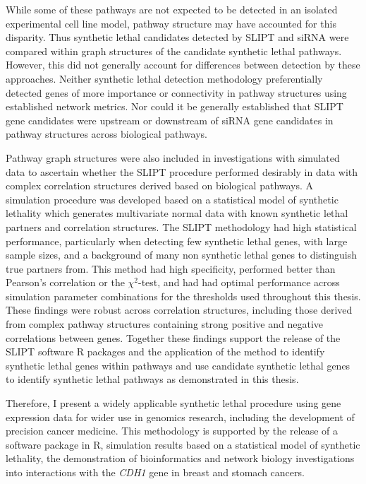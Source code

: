 While some of these pathways are not expected to be detected in an isolated experimental cell line model, pathway structure may have accounted for this disparity. Thus synthetic lethal candidates detected by \gls{SLIPT} and \gls{siRNA} were compared within graph structures of the candidate synthetic lethal pathways. However, this did not generally account for differences between detection by these approaches. Neither synthetic lethal detection methodology preferentially detected genes of more importance or connectivity in pathway structures using established network metrics. Nor could it be generally established that \gls{SLIPT} gene candidates were upstream or downstream of \gls{siRNA} gene candidates in pathway structures across biological pathways.

Pathway graph structures were also included in investigations with simulated data to ascertain whether the \gls{SLIPT} procedure performed desirably in data with complex correlation structures derived based on biological pathways. A simulation procedure was developed based on a statistical model of synthetic lethality which generates multivariate normal data with known synthetic lethal partners and correlation structures. The \gls{SLIPT} methodology had high statistical performance, particularly when detecting few synthetic lethal genes, with large sample sizes, and a background of many non synthetic lethal genes to distinguish true partners from. This method had high specificity, performed better than Pearson's correlation or the $\chi^2$-test, and had had optimal performance across simulation parameter combinations for the thresholds used throughout this thesis. These findings were robust across correlation structures, including those derived from complex pathway structures containing strong positive and negative correlations between genes. 
Together these findings support the release of the \gls{SLIPT} software R packages and the application of the method to identify synthetic lethal genes within pathways and use candidate synthetic lethal genes to identify synthetic lethal pathways as demonstrated in this thesis.

Therefore, I present a widely applicable synthetic lethal procedure using gene expression data for wider use in genomics research, including the development of precision cancer medicine. This methodology is supported by the release of a software package in R, simulation results based on a statistical model of synthetic lethality, the demonstration of bioinformatics and network biology investigations into interactions with the \textit{CDH1} gene in breast and stomach cancers. 


